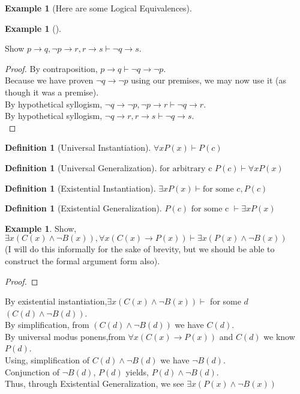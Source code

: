 \documentclass[letterpaper,10pt]{article}
\theoremstyle{plain}
\theoremstyle{definition}
\newtheorem{defn}[thm]{Definition}
\newtheorem{exmp}[thm]{Example}
\theoremstyle{remark}
\providecommand{\land}{\ensuremath{\wedge}}
\begin{document}
\begin{exmp}[Here are some Logical Equivalences]
\begin{exmp}[]
\begin{enumerate}
Show $p \to q, \lnot p \to r,r \to s \vdash \lnot q \to s$.
\begin{proof}
By contraposition, $p\to q\vdash \lnot q \to \lnot p $.\\
Because we have proven $\lnot q \to \lnot p$ using our premises, we may now use it (as though it was a premise).\\
By hypothetical syllogism, $\lnot q \to \lnot p, \lnot p \to r \vdash  \lnot q \to r$.\\
By hypothetical syllogism, $\lnot q \to r, r \to s \vdash  \lnot q \to s$.\\
\end{proof}
\end{enumerate}
\end{exmp}
\vspace{4cm}
\newpage 
\begin{defn}[Universal Instantiation]
$\forall x P(x) \vdash P(c)$
\end{defn}
\begin{defn}[Universal Generalization]
$\text{for arbitrary c } P(c)  \vdash \forall x P(x) $
\end{defn}
\begin{defn}[Existential Instantiation]
$\exists x P(x) \vdash \text{for some } c, P(c)$
\end{defn}
\begin{defn}[Existential Generalization]
$ P(c) \text{ for some c } \vdash \exists x P(x)$
\end{defn}
\begin{exmp}
Show,
$\exists x(C(x)\land \lnot B(x)), \forall x(C(x) \to P(x)) \vdash \exists x(P(x)\land \lnot B(x))$
\\
(I will do this informally for the sake of brevity, but we should be able to construct the formal argument form also).
\begin{proof}

\end{proof}
By existential instantiation,$\exists x(C(x)\land \lnot B(x))\vdash$ for some $d$ $(C(d)\land \lnot B(d))$. \\
By simplification, from $(C(d)\land \lnot B(d))$ we have $ C(d)$.\\
By universal modus ponens,from 
$\forall x(C(x) \to P(x))$ and $C(d)$ we know $P(d)$.\\
Using, simplification of $C(d)\land \lnot B(d)$ we have  $\lnot B(d)$. 
\\
Conjunction of $\lnot B(d)$, $P(d)$ yields, $P(d) \land \lnot B(d)$.
\\ Thus, through Existential Generalization, we see $\exists x(P(x)\land \lnot B(x))$






\end{exmp}
\end{exmp}
\end{document}
